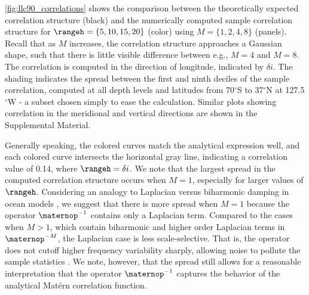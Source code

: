 \documentclass[alpha-refs]{wiley-article}
\begin{document}
\cref{fig:llc90_correlations} shows the comparison between the theoretically
expected correlation structure (black) and the numerically computed sample
correlation structure for
$\rangeh = \{5, 10, 15, 20\}$ (color) using $M =\{1,2,4,8\}$ (panels).
Recall that as $M$ increases, the correlation structure approaches a Gaussian
shape, such that there is little visible difference between e.g., $M=4$ and
$M=8$.
The correlation is computed in the direction of longitude, indicated by
$\delta i$.
The shading indicates the spread between the first and ninth deciles of the
sample correlation, computed at all depth levels and latitudes from
70$^\circ$S to 37$^\circ$N at 127.5$^\circ$W - a subset chosen simply to ease the
calculation.
Similar plots showing correlation in the meridional and vertical directions are
shown in the Supplemental Material.

Generally speaking, the colored curves match the analytical expression well, and
each colored curve intersects the horizontal gray line, indicating a correlation
value of 0.14, where $\rangeh = \delta i$.
We note that the largest spread in the computed correlation structure occurs
when $M=1$, especially for larger values of $\rangeh$.
Considering an analogy to Laplacian versus biharmonic damping in ocean models
\citep[e.g.,][]{holland_role_1978,griffies_biharmonic_2000}, we suggest that
there is more spread when $M=1$ because the operator $\maternop^{-1}$
contains only a Laplacian term.
Compared to the cases when $M>1$, which contain biharmonic and higher order
Laplacian terms in $\maternop^{-M}$, the Laplacian case is less
scale-selective.
That is, the operator does not cutoff higher frequency variability sharply,
allowing noise to pollute the sample statistics \citep[see][Section 2 for a quantitative
description of this cutoff in frequency space]{griffies_biharmonic_2000}.
We note, however, that the spread still allows for a reasonable interpretation
that the operator $\maternop^{-1}$ captures the behavior of the analytical Mat\'ern correlation
function.
\end{document}
